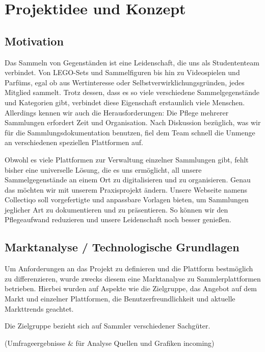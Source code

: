 \section{Projektidee und Konzept}\label{sec:projektidee-und-konzept}

\subsection{Motivation}\label{subsec:motivation}


Das Sammeln von Gegenständen ist eine Leidenschaft, die uns als Studententeam verbindet.
Von LEGO-Sets und Sammelfiguren bis hin zu Videospielen und Parfüms, egal ob aus Wertinteresse oder Selbstverwirklichungsgründen, jedes Mitglied sammelt.
Trotz dessen, dass es so viele verschiedene Sammelgegenstände und Kategorien gibt, verbindet diese Eigenschaft erstaunlich viele Menschen.
Allerdings kennen wir auch die Herausforderungen: Die Pflege mehrerer Sammlungen erfordert Zeit und Organisation.
Nach Diskussion bezüglich, was wir für die Sammlungsdokumentation benutzen, fiel dem Team schnell die Unmenge an verschiedenen speziellen Plattformen auf. \par
Obwohl es viele Plattformen zur Verwaltung einzelner Sammlungen gibt, fehlt bisher eine universelle Lösung, die es uns ermöglicht, all unsere Sammelgegenstände an einem Ort zu digitalisieren und zu organisieren.
Genau das möchten wir mit unserem Praxisprojekt ändern.
Unsere Webseite namens Collectiqo soll vorgefertigte und anpassbare Vorlagen bieten, um Sammlungen jeglicher Art zu dokumentieren und zu präsentieren.
So können wir den Pflegeaufwand reduzieren und unsere Leidenschaft noch besser genießen.


\subsection{Marktanalyse / Technologische Grundlagen}\label{subsec:marktanalyse-technologische-grundlagen}

Um Anforderungen an das Projekt zu definieren und die Plattform bestmöglich zu differenzieren, wurde zwecks diesem eine Marktanalyse zu Sammlerplattformen betrieben.
Hierbei wurden auf Aspekte wie die Zielgruppe, das Angebot auf dem Markt und einzelner Plattformen, die Benutzerfreundlichkeit und aktuelle Markttrends geachtet. \par
Die Zielgruppe bezieht sich auf Sammler verschiedener Sachgüter. \linebreak

(Umfrageergebnisse \& für Analyse Quellen und Grafiken incoming)

